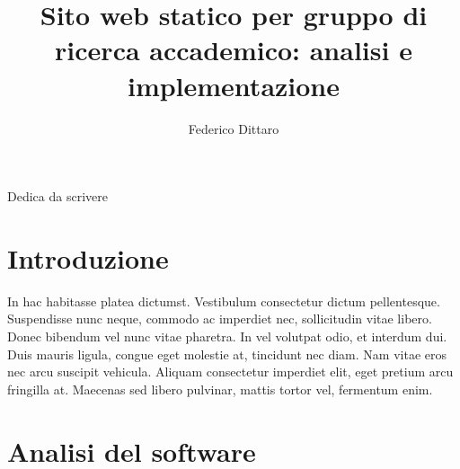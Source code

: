 \documentclass[target=bach,aauheader=]{thud}
\title{Sito web statico per gruppo di ricerca accademico: analisi e implementazione}
\author{Federico Dittaro}
\begin{document}
\maketitle

\newpage 
Dedica da scrivere 

\tableofcontents



\mainmatter



\chapter{Introduzione}
In hac habitasse platea dictumst. Vestibulum consectetur dictum pellentesque. Suspendisse nunc neque, commodo ac imperdiet nec, sollicitudin vitae libero. Donec bibendum vel nunc vitae pharetra. In vel volutpat odio, et interdum dui. Duis mauris ligula, congue eget molestie at, tincidunt nec diam. Nam vitae eros nec arcu suscipit vehicula. Aliquam consectetur imperdiet elit, eget pretium arcu fringilla at. Maecenas \cite{Knu86} sed libero pulvinar, mattis tortor vel, fermentum enim.

\chapter{Analisi del software}

\end{document}
